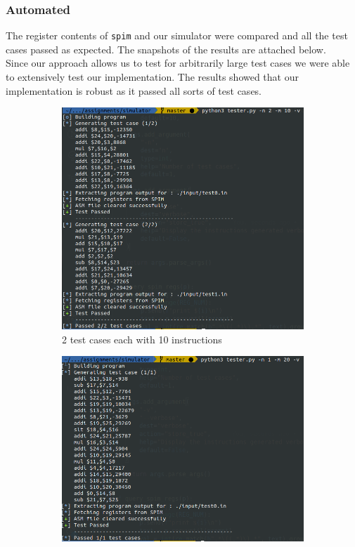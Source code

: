 \documentclass[hidelinks,12pt]{article}
\begin{document}
\subsubsection{Automated}
The register contents of \verb|spim| and our simulator were compared and all the test cases passed as expected. The snapshots of the results are attached below.\\

Since our approach allows us to test for arbitrarily large test cases we were able to extensively test our implementation. The results showed that our implementation is robust as it passed all sorts of test cases.
\begin{figure}[H]
    \centering
    \begin{subfigure}[t]{\textwidth}
        \centering
        \includegraphics[scale=0.4]{n2_m10.png}
        \caption{2 test cases each with 10 instructions}
    \end{subfigure}
    \begin{subfigure}[t]{\textwidth}
        \centering
        \includegraphics[scale=0.4]{n1_m20.png}

\end{subfigure}
\end{figure}
\end{document}
